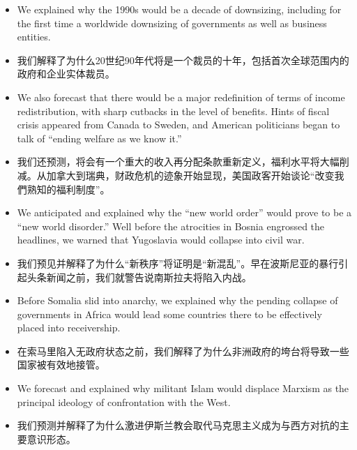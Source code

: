 \begin{itemize}
\item We explained why the 1990s would be a decade of downsizing, including for the first time a worldwide downsizing of governments as well as business entities. 
\item \small 我们解释了为什么20世纪90年代将是一个裁员的十年，包括首次全球范围内的政府和企业实体裁员。
\end{itemize}


\begin{itemize}
\item We also forecast that there would be a major redefinition of terms of income redistribution, with sharp cutbacks in the level of benefits. Hints of fiscal crisis appeared from Canada to Sweden, and American politicians began to talk of “ending welfare as we know it.”
\item \small 我们还预测，将会有一个重大的收入再分配条款重新定义，福利水平将大幅削减。从加拿大到瑞典，财政危机的迹象开始显现，美国政客开始谈论“改变我們熟知的福利制度”。
\end{itemize}


\begin{itemize}
\item We anticipated and explained why the “new world order” would prove to be a “new world disorder.” Well before the atrocities in Bosnia engrossed the headlines, we warned that Yugoslavia would collapse into civil war. 
\item \small 我们预见并解释了为什么“新秩序”将证明是“新混乱”。早在波斯尼亚的暴行引起头条新闻之前，我们就警告说南斯拉夫将陷入内战。
\end{itemize}


\begin{itemize}
\item Before Somalia slid into anarchy, we explained why the pending collapse of governments in Africa would lead some countries there to be effectively placed into receivership. 
\item \small 在索马里陷入无政府状态之前，我们解释了为什么非洲政府的垮台将导致一些国家被有效地接管。
\end{itemize}


\begin{itemize}
\item We forecast and explained why militant Islam would displace Marxism as the principal ideology of confrontation with the West.
\item \small 我们预测并解释了为什么激进伊斯兰教会取代马克思主义成为与西方对抗的主要意识形态。
\end{itemize}


